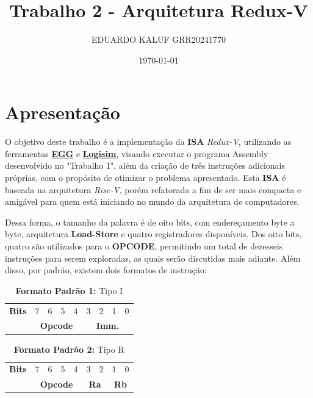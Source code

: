 \documentclass{article}  %
\title{Trabalho 2 - Arquitetura Redux-V}
\author{EDUARDO KALUF GRR20241770}
\date{\today}
\begin{document}
    \maketitle
    
    \section{Apresentação}
    
    \setlength{\parindent}{15pt}

    O objetivo deste trabalho é a implementação da \textbf{ISA} \textit{Redux-V}, utilizando as ferramentas \href{https://github.com/gboncoffee/egg}{\textbf{EGG}} e \href{https://github.com/logisim-evolution/logisim-evolution}{\textbf{Logisim}}, visando executar o programa Assembly desenvolvido no "Trabalho 1", além da criação de três instruções adicionais próprias, com o propósito de otimizar o problema apresentado.
    Esta \textbf{ISA} é baseada na arquitetura \textit{Risc-V}, porém refatorada a fim de ser mais compacta e amigável para quem está iniciando no mundo da arquitetura de computadores.
    
    Dessa forma, o tamanho da palavra é de oito bits, com endereçamento byte a byte, arquitetura \textbf{Load-Store} e quatro registradores disponíveis.
    Dos oito bits, quatro são utilizados para o \textbf{OPCODE}, permitindo um total de dezesseis instruções para serem exploradas, as quais serão discutidas mais adiante. Além disso, por padrão, existem dois formatos de instrução:

    \begin{table}[h]
      \captionsetup{labelformat=empty, skip=0pt}
      \caption{\textbf{Formato Padrão 1:} Tipo I}
      \centering
      \begin{tabular}{|c|*{8}{c|}}
        \hline
        \rowcolor{green!50}
        \multicolumn{9}{|c|}{\textbf{Tipo I}} \\ \hline
        \textbf{Bits} & 7 & 6 & 5 & 4 & 3 & 2 & 1 & 0 \\ \hline
        & \multicolumn{4}{c|}{\textbf{Opcode}} & \multicolumn{4}{c|}{\textbf{Imm.}} \\ \hline
      \end{tabular}
    \end{table}

    \begin{table}[h]
      \captionsetup{labelformat=empty, skip=0pt}
      \caption{\textbf{Formato Padrão 2:} Tipo R}
      \centering
      \begin{tabular}{|c|*{8}{c|}}
        \hline
        \rowcolor{blue!50}
        \multicolumn{9}{|c|}{\textbf{Tipo R}} \\ \hline
        \textbf{Bits} & 7 & 6 & 5 & 4 & 3 & 2 & 1 & 0 \\ \hline
        & \multicolumn{4}{c|}{\textbf{Opcode}} & \multicolumn{2}{c|}{\textbf{Ra}} & \multicolumn{2}{c|}{\textbf{Rb}} \\ \hline
      \end{tabular}
    \end{table}
\end{document}
